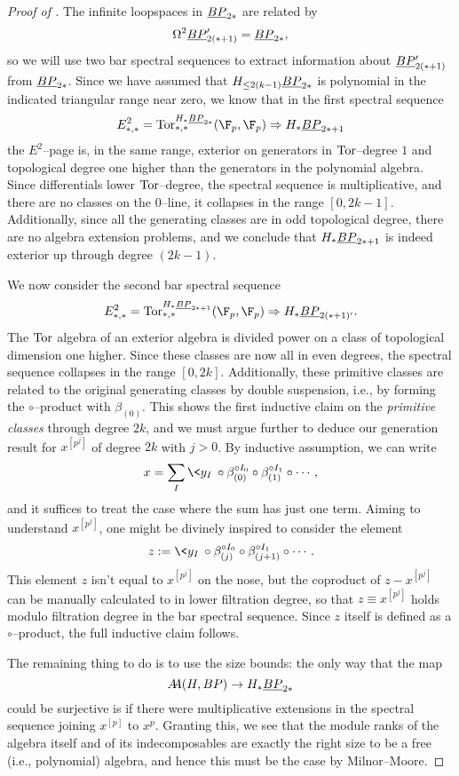 \begin{proof}[{Proof of }]
The infinite loopspaces in \(\OS{BP}{2*}\) are related by \[\Loops^2 \OS{BP}{2(*+1)}' = \OS{BP}{2*},\] so we will use two bar spectral sequences to extract information about \(\OS{BP}{2(*+1)}'\) from \(\OS{BP}{2*}\).  Since we have assumed that \(H_{\le 2(k-1)} \OS{BP}{2*}\) is polynomial in the indicated triangular range near zero, we know that in the first spectral sequence \[E^2_{*, *} = \Tor^{H_* \OS{BP}{2*}}_{*, *}(\F_p, \F_p) \Rightarrow H_* \OS{BP}{2*+1}\] the \(E^2\)--page is, in the same range, exterior on generators in \(\operatorname{Tor}\)--degree \(1\) and topological degree one higher than the generators in the polynomial algebra.  Since differentials lower \(\operatorname{Tor}\)--degree, the spectral sequence is multiplicative, and there are no classes on the \(0\)--line, it collapses in the range \([0, 2k-1]\).  Additionally, since all the generating classes are in odd topological degree, there are no algebra extension problems, and we conclude that \(H_* \OS{BP}{2*+1}\) is indeed exterior up through degree \((2k-1)\).

We now consider the second bar spectral sequence \[E^2_{*, *} = \Tor^{H_* \OS{BP}{2*+1}}_{*, *}(\F_p, \F_p) \Rightarrow H_* \OS{BP}{2(*+1)'}.\]  The \(\operatorname{Tor}\) algebra of an exterior algebra is divided power on a class of topological dimension one higher.  Since these classes are now all in even degrees, the spectral sequence collapses in the range \([0, 2k]\).  Additionally, these primitive classes are related to the original generating classes by double suspension, i.e., by forming the \(\circ\)--product with \(\beta_{(0)}\).  This shows the first inductive claim on the \emph{primitive classes} through degree \(2k\), and we must argue further to deduce our generation result for \(x^{[p^j]}\) of degree \(2k\) with \(j > 0\).  By inductive assumption, we can write \[x = \sum_I \<y_I\> \circ \beta_{(0)}^{\circ I_0} \circ \beta_{(1)}^{\circ I_1} \circ \cdots,\] and it suffices to treat the case where the sum has just one term.  Aiming to understand \(x^{[p^j]}\), one might be divinely inspired to consider the element \[z := \<y_I\> \circ \beta_{(j)}^{\circ I_0} \circ \beta_{(j+1)}^{\circ I_1} \circ \cdots.\]  This element \(z\) isn't equal to \(x^{[p^j]}\) on the nose, but the coproduct of \(z - x^{[p^j]}\) can be manually calculated to in lower filtration degree, so that \(z \equiv x^{[p^j]}\) holds modulo filtration degree in the bar spectral sequence.  Since \(z\) itself is defined as a \(\circ\)--product, the full inductive claim follows.

The remaining thing to do is to use the size bounds: the only way that the map \[\AA(H, BP) \to H_* \OS{BP}{2*}\] could be surjective is if there were multiplicative extensions in the spectral sequence joining \(x^{[p]}\) to \(x^p\).  Granting this, we see that the module ranks of the algebra itself and of its indecomposables are exactly the right size to be a free (i.e., polynomial) algebra, and hence this must be the case by Milnor--Moore.
\end{proof}

